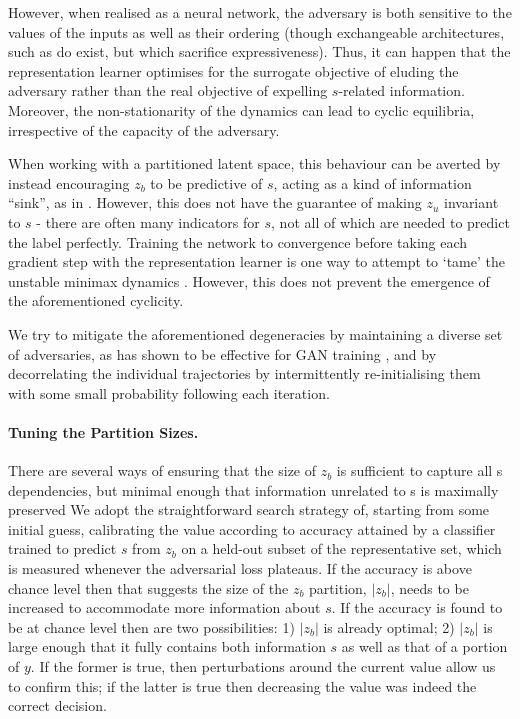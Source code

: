 However, when realised as a neural network, the adversary is both sensitive to the values of the
inputs as well as their ordering (though exchangeable architectures, such as \citet{zaheer2017deep}
do exist, but which sacrifice expressiveness). 
%
Thus, it can happen that the representation learner optimises for the surrogate objective of
eluding the adversary rather than the real objective of expelling $s$-related information. 
%
Moreover, the non-stationarity of the dynamics can lead to cyclic equilibria, irrespective of the
capacity of the adversary.

When working with a partitioned latent space, this behaviour can be averted by instead encouraging
$z_b$ to be predictive of $s$, acting as a kind of information ``sink'', as in \citet{JacSmeOya18}.
%
However, this does not have the guarantee of making $z_u$ invariant to $s$ - there are often many
indicators for $s$, not all of which are needed to predict the label perfectly. 
%
Training the network to convergence before taking each gradient step with the representation
learner is one way to attempt to `tame' the unstable minimax dynamics \citep{feng2019learning}. 
%
However, this does not prevent the emergence of the aforementioned cyclicity.

We try to mitigate the aforementioned degeneracies by maintaining a diverse set of adversaries, as
has shown to be effective for GAN training \citep{durugkar2016generative}, and by decorrelating the
individual trajectories by intermittently re-initialising them with some small probability
following each iteration.

\paragraph{Tuning the Partition Sizes.}
%
There are several ways of ensuring that the size of $z_b$ is sufficient to capture all s
dependencies, but minimal enough that information unrelated to s is maximally preserved We adopt
the straightforward search strategy of, starting from some initial guess, calibrating the value
according to accuracy attained by a classifier trained to predict $s$ from $z_b$ on a held-out
subset of the representative set, which is measured whenever the adversarial loss plateaus. 
%
If the accuracy is above chance level then that suggests the size of the $z_b$ partition, $|z_b|$,
needs to be increased to accommodate more information about $s$. 
%
If the accuracy is found to be at chance level then are two possibilities: 
%
1) $|z_b|$ is already optimal; 
%
2) $|z_b|$ is large enough that it fully contains both information $s$ as well as that of a portion
of $y$. 
%
If the former is true, then perturbations around the current value allow us to confirm this; if the
latter is true then decreasing the value was indeed the correct decision.

